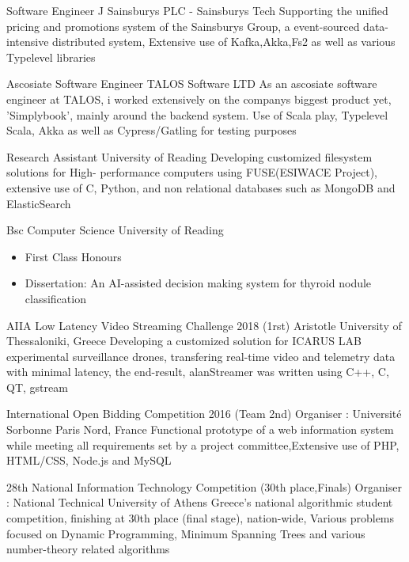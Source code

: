 \documentclass[a4paper]{ReadableCV}
\begin{document}
	{Software Engineer}
	{J Sainsburys PLC - Sainsburys Tech}
	{Supporting the unified pricing and promotions system  of the Sainsburys Group, a event-sourced data-intensive distributed system, Extensive use of Kafka,Akka,Fs2 as well as various Typelevel libraries }
	
	{Ascosiate Software Engineer}
	{TALOS Software LTD}
	{As an ascosiate software engineer at TALOS, i worked extensively on the companys biggest product yet, 'Simplybook', mainly around the 
	backend system. Use of Scala play, Typelevel Scala, Akka as well as Cypress/Gatling for testing purposes }
	
	
	{Research Assistant}
	{University of Reading}
	{Developing customized filesystem solutions for High- performance computers using FUSE(ESIWACE Project), extensive use of C, Python, and non relational databases such as MongoDB and ElasticSearch}
	
	\newpage
	
	
	{Bsc Computer Science}
	{University of Reading}
	{\begin{itemize}
			\item First Class Honours
			\item Dissertation: An AI-assisted decision making system for thyroid nodule classification 
		\end{itemize}
	}
	
	
	{AIIA Low Latency Video Streaming Challenge 2018 (1rst)}
	{Aristotle University of Thessaloniki, Greece}
	{Developing a customized solution for ICARUS LAB experimental surveillance drones, transfering real-time video and telemetry data with minimal latency, the end-result, alanStreamer was written using C++, C, QT, gstream}
	
	{International Open Bidding Competition 2016 (Team 2nd)}
	{Organiser : Université Sorbonne Paris Nord, France}
	{Functional prototype of a web information system while meeting all requirements set by a project committee,Extensive use of PHP, HTML/CSS,  Node.js and MySQL}
	
	{28th National Information Technology Competition (30th place,Finals)}
	{Organiser : National Technical University of Athens}
	{Greece's national algorithmic student competition, finishing at 30th place (final stage), nation-wide, Various problems
	focused on Dynamic Programming, Minimum Spanning Trees and various number-theory related algorithms}
	
\end{document}
